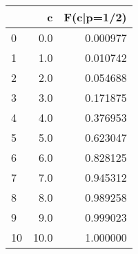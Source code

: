 \begin{tabular}{lrr}
\toprule
{} &     c & F(c|p=1/2) \\
\midrule
0  &   0.0 &   0.000977 \\
1  &   1.0 &   0.010742 \\
2  &   2.0 &   0.054688 \\
3  &   3.0 &   0.171875 \\
4  &   4.0 &   0.376953 \\
5  &   5.0 &   0.623047 \\
6  &   6.0 &   0.828125 \\
7  &   7.0 &   0.945312 \\
8  &   8.0 &   0.989258 \\
9  &   9.0 &   0.999023 \\
10 &  10.0 &   1.000000 \\
\bottomrule
\end{tabular}
